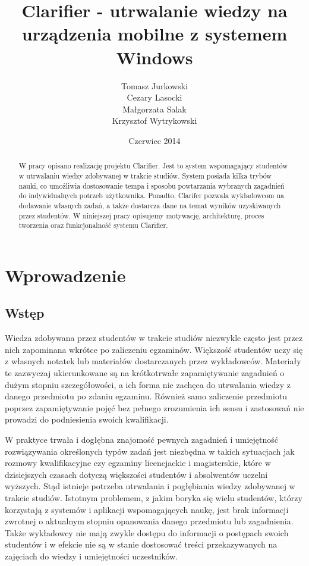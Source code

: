 \documentclass{pracamgr}
\author{Tomasz Jurkowski\\ 
Cezary Lasocki\\ 
Małgorzata Salak\\
Krzysztof Wytrykowski}
\title{Clarifier - utrwalanie wiedzy na urządzenia mobilne z systemem Windows}
\date{Czerwiec 2014}
\begin{document}
\maketitle

\begin{abstract}
W pracy opisano realizację projektu Clarifier. Jest to system wspomagający studentów w utrwalaniu wiedzy zdobywanej w trakcie studiów. System posiada kilka trybów nauki, co umożliwia dostosowanie tempa i sposobu powtarzania wybranych zagadnień do indywidualnych potrzeb użytkownika. Ponadto, Clarifer pozwala wykładowcom na dodawanie własnych zadań, a także dostarcza dane na temat wyników uzyskiwanych przez studentów. W niniejszej pracy opisujemy motywację, architekturę, proces tworzenia oraz funkcjonalność systemu Clarifier. 
\end{abstract}

\tableofcontents

\chapter*{Wprowadzenie}

\section{Wstęp}

Wiedza zdobywana przez studentów w trakcie studiów niezwykle często jest przez nich zapominana wkrótce po zaliczeniu egzaminów. Większość studentów uczy się z własnych notatek lub materiałów dostarczanych przez
wykładowców. Materiały te zazwyczaj ukierunkowane są na krótkotrwałe zapamiętywanie zagadnień o dużym stopniu szczegółowości, a ich forma nie zachęca do utrwalania
wiedzy z danego przedmiotu po zdaniu egzaminu. Również samo zaliczenie przedmiotu poprzez zapamiętywanie pojęć bez pełnego zrozumienia ich sensu i zastosowań nie prowadzi do podniesienia swoich kwalifikacji.

W praktyce trwała i dogłębna znajomość pewnych zagadnień i umiejętność rozwiązywania określonych typów zadań jest niezbędna w takich sytuacjach jak rozmowy kwalifikacyjne czy egzaminy licencjackie i magisterskie, które w dzisiejszych czasach dotyczą większości studentów i absolwentów uczelni wyższych. Stąd istnieje potrzeba utrwalania i pogłębiania wiedzy zdobywanej w
trakcie studiów. Istotnym problemem, z jakim boryka się wielu studentów, którzy korzystają z systemów i aplikacji wspomagających naukę, jest brak informacji zwrotnej o aktualnym stopniu opanowania danego przedmiotu lub zagadnienia. Także wykładowcy nie mają zwykle dostępu do informacji o postępach swoich studentów i w efekcie nie są w stanie dostosować treści przekazywanych na zajęciach do wiedzy i umiejętności uczestników.  
\end{document}
